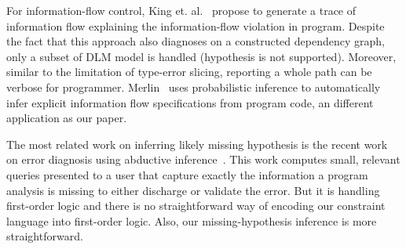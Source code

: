 For information-flow control, King et. al.~\cite{king:fse} propose to
generate a trace of information flow explaining the information-flow violation
in program. Despite the fact that this approach also diagnoses on a constructed
dependency graph, only a subset of DLM model is handled (hypothesis is not
supported). Moreover, similar to the limitation of type-error slicing,
reporting a whole path can be verbose for programmer.
Merlin~\cite{livshits:merlin} uses probabilistic inference to automatically
infer explicit information flow specifications from program code, an different
application as our paper.

The most related work on inferring likely missing hypothesis is the recent work
on error diagnosis using abductive inference~\cite{dillig:pldi12}. This work
computes small, relevant queries presented to a user that capture exactly the
information a program analysis is missing to either discharge or validate the
error. But it is handling first-order logic and there is no straightforward way
of encoding our constraint language into first-order logic. Also, our
missing-hypothesis inference is more straightforward.






